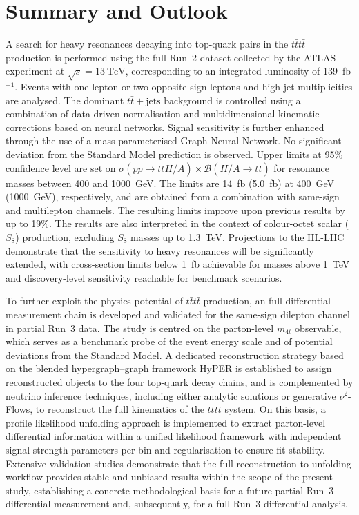 ﻿%

\chapter{Summary and Outlook}

A search for heavy resonances decaying into top-quark pairs in the $t\bar{t}t\bar{t}$ production is performed 
using the full Run~2 dataset collected by the ATLAS experiment at $\sqrt{s}=13~\mathrm{TeV}$, 
corresponding to an integrated luminosity of 139~fb$^{-1}$. 
Events with one lepton or two opposite-sign leptons and high jet multiplicities are analysed. 
The dominant $t\bar{t}+\text{jets}$ background is controlled using a combination of 
data-driven normalisation and multidimensional kinematic corrections based on neural networks. 
Signal sensitivity is further enhanced through the use of a mass-parameterised Graph Neural Network.
No significant deviation from the Standard Model prediction is observed. 
Upper limits at 95\% confidence level are set on 
$\sigma(pp \to t\bar{t}H/A)\times \mathcal{B}(H/A \to t\bar{t})$ 
for resonance masses between 400 and 1000~GeV. 
The limits are 14~fb (5.0~fb) at 400~GeV (1000~GeV), respectively, 
and are obtained from a combination with same-sign and multilepton channels.
The resulting limits improve upon previous results by up to 19\%. 
The results are also interpreted in the context of colour-octet scalar ($S_8$) production, 
excluding $S_8$ masses up to 1.3~TeV. 
Projections to the HL-LHC demonstrate that the sensitivity to heavy resonances 
will be significantly extended, with cross-section limits below 1~fb achievable 
for masses above 1~TeV and discovery-level sensitivity reachable for benchmark scenarios.

To further exploit the physics potential of $t\bar{t}t\bar{t}$ production, 
an full differential measurement chain is developed and validated for the same-sign dilepton channel in partial Run~3 data. 
The study is centred on the parton-level $m_{4t}$ observable, which serves as a benchmark probe of the event energy scale and of potential deviations from the Standard Model. 
A dedicated reconstruction strategy based on the blended hypergraph--graph framework HyPER is established to assign reconstructed objects to the four top-quark decay chains, 
and is complemented by neutrino inference techniques, including either analytic solutions or generative $\nu^2$-Flows, to reconstruct the full kinematics of the $t\bar{t}t\bar{t}$ system. 
On this basis, a profile likelihood unfolding approach is implemented to extract parton-level differential information within a unified likelihood framework with independent signal-strength parameters per bin and regularisation to ensure fit stability. 
Extensive validation studies demonstrate that the full reconstruction-to-unfolding workflow provides stable and unbiased results within the scope of the present study, 
establishing a concrete methodological basis for a future partial Run~3 differential measurement and, subsequently, for a full Run~3 differential analysis.

